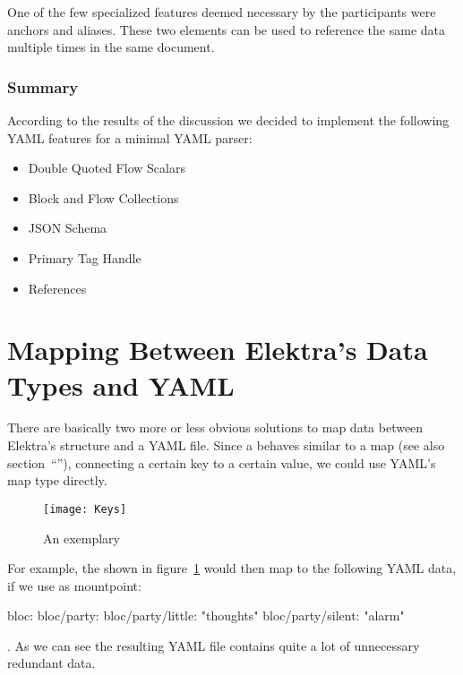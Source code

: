 One of the few specialized features deemed necessary by the participants were anchors and aliases. These two elements can be used to reference the same data multiple times in the same document.

\subsubsection{Summary}

According to the results of the discussion we decided to implement the following YAML features for a minimal YAML parser:

\begin{itemize}
  \item Double Quoted Flow Scalars
  \item Block and Flow Collections
  \item JSON Schema
  \item Primary Tag Handle
  \item References
\end{itemize}

\section{Mapping Between Elektra’s Data Types and YAML}
\label{sec:mapping_elektra_yaml}

\begin{sloppypar}
  There are basically two more or less obvious solutions to map data between Elektra’s  structure and a YAML file. Since a  behaves similar to a map (see also section~“”), connecting a certain key to a certain value, we could use YAML’s map type directly.
\end{sloppypar}

\begin{figure}
  \centering
    \texttt{[image: Keys]}
  \caption{An exemplary }
  \label{fig:keys}
\end{figure}

For example, the  shown in figure~\ref{fig:keys} would then map to the following YAML data, if we use  as mountpoint:

\begin{yamlcode}
  bloc:
  bloc/party:
  bloc/party/little: "thoughts"
  bloc/party/silent: "alarm"
\end{yamlcode}

. As we can see the resulting YAML file contains quite a lot of unnecessary redundant data.

